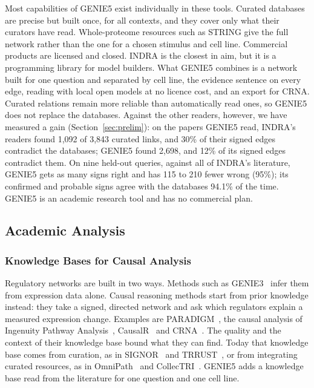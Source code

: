 \documentclass[11pt,a4paper]{article}
\newcommand{\gen}{GENIE5}
\begin{document}
Most capabilities of \gen{} exist individually in these tools. Curated databases are precise but
built once, for all contexts, and they cover only what their curators have read. Whole-proteome
resources such as STRING give the full network rather than the one for a chosen stimulus and cell
line. Commercial products are licensed and closed. INDRA is the closest in aim, but it is a
programming library for model builders. What \gen{} combines is a network built for one question
and separated by cell line, the evidence sentence on every edge, reading with local open models at
no licence cost, and an export for CRNA. Curated relations remain more reliable than
automatically read ones, so \gen{} does not replace the databases. Against the other readers,
however, we have measured a gain (Section~\ref{sec:prelim}): on the papers \gen{} read, INDRA's
readers found 1,092 of 3,843 curated links, and 30\% of their signed edges contradict the
databases; \gen{} found 2,698, and 12\% of its signed edges contradict them. On nine held-out queries, against all of INDRA's
literature, \gen{} gets as many signs right and has 115 to 210 fewer wrong (95\%); its
confirmed and probable signs agree with the databases 94.1\% of the time.
\gen{} is an academic research tool and has no commercial plan.

\subsection{Academic Analysis}

\subsubsection{Knowledge Bases for Causal Analysis}

Regulatory networks are built in two ways. Methods such as GENIE3~\cite{genie3} infer them from
expression data alone. Causal reasoning methods start from prior knowledge instead: they take a
signed, directed network and ask which regulators explain a measured expression change. Examples
are PARADIGM~\cite{paradigm}, the causal analysis of Ingenuity Pathway Analysis~\cite{ipa},
CausalR~\cite{causalr} and CRNA~\cite{crna}. The quality and the context of their knowledge base
bound what they can find. Today that knowledge base comes from curation, as in
SIGNOR~\cite{signor} and TRRUST~\cite{trrust}, or from integrating curated resources, as in
OmniPath~\cite{omnipath} and CollecTRI~\cite{collectri}. \gen{} adds a knowledge base read from the
literature for one question and one cell line.
\end{document}
